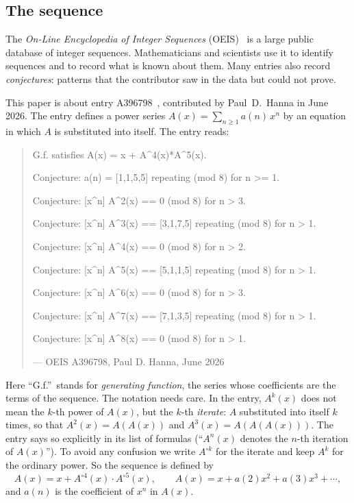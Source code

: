 \documentclass[11pt,a4paper]{article}
\theoremstyle{definition}
\theoremstyle{remark}
\begin{document}
\subsection{The sequence}\label{sec:sequence}
The \emph{On-Line Encyclopedia of Integer Sequences} (OEIS)~\cite{oeisdb} is a large public database of integer
sequences. Mathematicians and scientists use it to identify sequences and to record what is known about them. Many
entries also record \emph{conjectures}: patterns that the contributor saw in the data but could not prove.

This paper is about entry A396798~\cite{oeis}, contributed by Paul~D.~Hanna in June 2026.
The entry defines a power series $A(x)=\sum_{n\ge1}a(n)\,x^n$ by an equation in which $A$ is substituted into
itself. The entry reads:
\begin{quote}\small\ttfamily\raggedright G.f. satisfies A(x) = x + A\^{}4(x)*A\^{}5(x).\par\smallskip Conjecture: a(n) = [1,1,5,5] repeating (mod 8) for n >= 1.\par\smallskip Conjecture: [x\^{}n] A\^{}2(x) == 0 (mod 8) for n > 3.\par\smallskip Conjecture: [x\^{}n] A\^{}3(x) == [3,1,7,5] repeating (mod 8) for n > 1.\par\smallskip Conjecture: [x\^{}n] A\^{}4(x) == 0 (mod 8) for n > 2.\par\smallskip Conjecture: [x\^{}n] A\^{}5(x) == [5,1,1,5] repeating (mod 8) for n > 1.\par\smallskip Conjecture: [x\^{}n] A\^{}6(x) == 0 (mod 8) for n > 3.\par\smallskip Conjecture: [x\^{}n] A\^{}7(x) == [7,1,3,5] repeating (mod 8) for n > 1.\par\smallskip Conjecture: [x\^{}n] A\^{}8(x) == 0 (mod 8) for n > 1.\par\smallskip\hfill\textrm{--- OEIS A396798, Paul D. Hanna, June 2026}\end{quote}

Here ``G.f.''\ stands for \emph{generating function}, the series whose coefficients are the terms of the sequence.
The notation needs care. In the entry, $A^k(x)$ does not mean the $k$-th power of $A(x)$, but the $k$-th
\emph{iterate}: $A$ substituted into itself $k$ times, so that $A^2(x)=A(A(x))$ and $A^3(x)=A(A(A(x)))$. The entry
says so explicitly in its list of formulas (``$A^n(x)$ denotes the $n$-th iteration of $A(x)$''). To avoid any
confusion we write $A^{\circ k}$ for the iterate and keep $A^k$ for the ordinary power. So the sequence is defined by
\begin{equation}\label{eq:def}
A(x)=x+A^{\circ4}(x)\cdot A^{\circ5}(x),\qquad A(x)=x+a(2)x^2+a(3)x^3+\cdots,
\end{equation}
and $a(n)$ is the coefficient of $x^n$ in $A(x)$.
\end{document}
